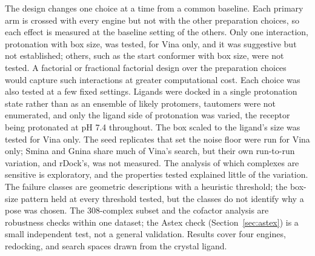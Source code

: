 The design changes one choice at a time from a common baseline. Each primary arm is crossed
with every engine but not with the other preparation choices, so each effect is measured at
the baseline setting of the others. Only one interaction, protonation with box size, was
tested, for Vina only, and it was suggestive but not established; others, such as the start
conformer with box size, were not tested. A factorial or fractional factorial design over
the preparation choices would capture such interactions at greater computational cost. Each
choice was also tested at a few fixed settings. Ligands were docked in a single protonation
state rather than as an ensemble of likely protomers, tautomers were not enumerated, and
only the ligand side of protonation was varied, the receptor being protonated at pH 7.4
throughout. The box scaled to the ligand's size was tested for Vina only. The seed
replicates that set the noise floor were run for Vina only; Smina and Gnina share much of
Vina's search, but their own run-to-run variation, and rDock's, was not measured. The analysis
of which complexes are sensitive is exploratory, and the properties tested explained
little of the variation. The failure classes are geometric descriptions with a heuristic
threshold; the box-size pattern held at every threshold tested, but the classes do not
identify why a pose was chosen. The 308-complex subset and the cofactor analysis are
robustness checks within one dataset; the Astex check (Section~\ref{sec:astex}) is a small
independent test, not a general validation. Results cover four engines, redocking, and
search spaces drawn from the crystal ligand.
